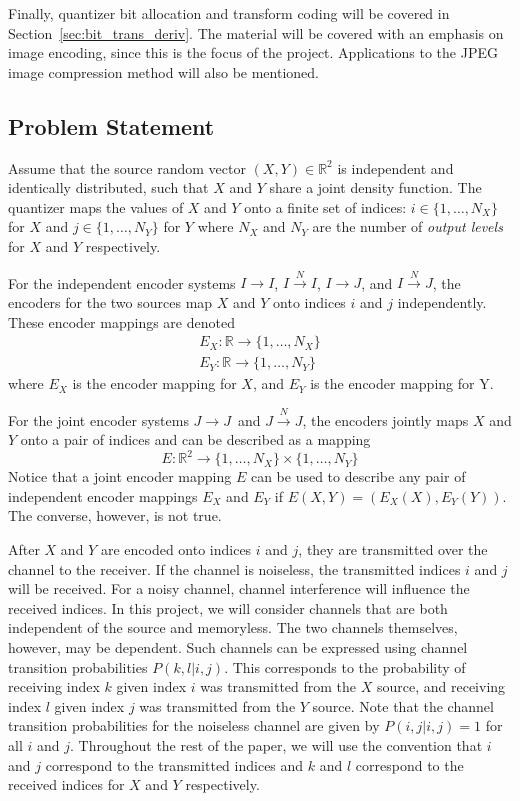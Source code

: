 \documentclass[10pt]{article}
\newcommand{\real}{\mathbb{R}}
\newcommand{\sysIIN}{\mbox{$I \overset{N}{\rightarrow} I$}}
\newcommand{\sysII}{\mbox{$I \rightarrow I$}}
\newcommand{\sysIJN}{\mbox{$I \overset{N}{\rightarrow} J$}}
\newcommand{\sysIJ}{\mbox{$I \rightarrow J$}}
\newcommand{\sysJJN}{\mbox{$J \overset{N}{\rightarrow} J$}}
\newcommand{\sysJJ}{\mbox{$J \rightarrow J$}}
\begin{document}
Finally, quantizer bit allocation and transform coding will be covered in Section~\ref{sec:bit_trans_deriv}. The material will be covered with an emphasis on image encoding, since this is the focus of the project. Applications to the JPEG image compression method will also be mentioned.

\subsection{Problem Statement}
\label{sec:prob_state}
Assume that the source random vector $(X,Y)\in\real^2$ is independent and identically distributed, such that $X$ and $Y$ share a joint density function. The quantizer maps the values of $X$ and $Y$ onto a finite set of indices: $i\in\{1,\ldots,N_X\}$ for $X$ and $j\in\{1,\ldots,N_Y\}$ for $Y$ where $N_X$ and $N_Y$ are the number of \emph{output levels} for $X$ and $Y$ respectively.

For the independent encoder systems \sysII, \sysIIN, \sysIJ, and \sysIJN, the encoders for the two sources map $X$ and $Y$ onto indices $i$ and $j$ independently. These encoder mappings are denoted
\begin{gather*}
    E_X : \real\to\{1,\ldots,N_X\} \\
    E_Y : \real\to\{1,\ldots,N_Y\}
\end{gather*}
where $E_X$ is the encoder mapping for $X$, and $E_Y$ is the encoder mapping for Y.

For the joint encoder systems \sysJJ\ and \sysJJN, the encoders jointly maps $X$ and $Y$ onto a pair of indices and can be described as a mapping
\begin{equation*}
    E : \real^2\to\{1,\ldots,N_X\} \times \{1,\ldots,N_Y\}
\end{equation*}
Notice that a joint encoder mapping $E$ can be used to describe any pair of independent encoder mappings $E_X$ and $E_Y$ if $E(X,Y) = (E_X(X),E_Y(Y))$. The converse, however, is not true.

After $X$ and $Y$ are encoded onto indices $i$ and $j$, they are transmitted over the channel to the receiver. If the channel is noiseless, the transmitted indices $i$ and $j$ will be received. For a noisy channel, channel interference will influence the received indices. In this project, we will consider channels that are both independent of the source and memoryless. The two channels themselves, however, may be dependent. Such channels can be expressed using channel transition probabilities $P(k,l|i,j)$. This corresponds to the probability of receiving index $k$ given index $i$ was transmitted from the $X$ source, and receiving index $l$ given index $j$ was transmitted from the $Y$ source. Note that the channel transition probabilities for the noiseless channel are given by $P(i,j|i,j)=1$ for all $i$ and $j$. Throughout the rest of the paper, we will use the convention that $i$ and $j$ correspond to the transmitted indices and $k$ and $l$ correspond to the received indices for $X$ and $Y$ respectively.
\end{document}
